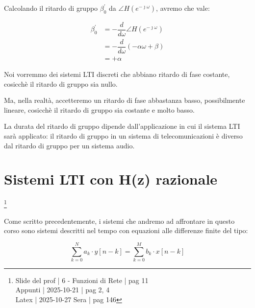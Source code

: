 \newpage 

Calcolando il ritardo di gruppo $\beta_0^{'}$ da $\angle H \left(e^{- \jmath \omega}\right)$, 
avremo che vale: 

{
    \Large 
    \begin{equation}
        \begin{split}
            \beta_0^{'} 
            &= 
            - \dfrac{d}{d \omega}
            \angle H \left(e^{- \jmath \omega}\right) 
            \\
            &=
            - \dfrac{d}{d \omega}
            \left( - \alpha \omega + \beta\right)
            \\
            &= 
            + \alpha
        \end{split}
    \end{equation}
}

\begin{tcolorbox}
    Noi vorremmo dei sistemi LTI discreti che abbiano ritardo di fase costante, cosicchè il ritardo di gruppo sia nullo. \newline 

    Ma, nella realtà, accetteremo un ritardo di fase abbastanza basso, possibilmente lineare, cosicchè il ritardo di gruppo sia costante e molto basso. \newline 

    La durata del ritardo di gruppo dipende dall'applicazione in cui il sistema LTI sarà applicato: il ritardo di gruppo in un sistema di telecomunicazioni è diverso dal ritardo di gruppo per un sistema audio. 
\end{tcolorbox}

\newpage 

\section{Sistemi LTI con H(z) razionale}

\footnote{ 
    Slide del prof | 6 - Funzioni di Rete | pag 11\\
    Appunti | 2025-10-21 | pag 2, 4 \\ 
    Latex | 2025-10-27 Sera | pag 146
} 

Come scritto precedentemente, i sistemi che andremo ad affrontare in questo corso sono sistemi descritti nel tempo 
con equazioni alle differenze finite del tipo: 

{
    \Large 
    \begin{equation}
        \sum_{k = 0}^{N}
        a_k \cdot y [n - k]
        =
        \sum_{k = 0}^{M}
        b_k \cdot x [n - k] 
    \end{equation}
} 

